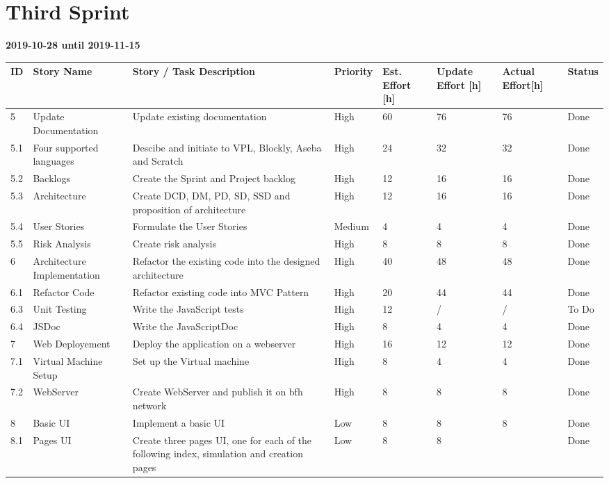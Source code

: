 \documentclass{scrreprt}
\begin{document}
\section{Third Sprint}
\textbf{2019-10-28 until 2019-11-15}
\begin{longtable}{p{5mm}|p{2cm}|p{4cm}|p{1cm}|p{1cm}|p{1cm}|p{1cm}|p{15mm}}
  ID                     & Story Name & Story / Task Description & Priority & Est. Effort {[}h{]} & Update Effort {[}h{]} & Actual Effort{[}h{]} & Status                \\ \hline
  5 & Update Documentation & Update existing documentation & High & 60 & 76 & 76 & Done \\
  5.1 & Four supported languages & Descibe and initiate to VPL, Blockly, Aseba and Scratch & High & 24 & 32 & 32 & Done \\ 
  5.2 & Backlogs & Create the Sprint and Project backlog & High & 12 & 16 & 16 & Done \\ 
  5.3 & Architecture & Create DCD, DM, PD, SD, SSD and proposition of architecture & High & 12 & 16 & 16 & Done \\
  5.4 & User Stories & Formulate the User Stories & Medium & 4 & 4 & 4 & Done \\ 
  5.5 & Risk Analysis & Create risk analysis & High & 8 & 8 & 8 & Done \\ 
  6 & Architecture Implementation & Refactor the existing code into the designed architecture & High & 40 & 48 & 48 & Done \\ 
  6.1 & Refactor Code & Refactor existing code into MVC Pattern & High & 20 & 44 & 44 & Done \\ 
  6.3 & Unit Testing & Write the JavaScript tests & High & 12 & {/} & {/} & To Do \\
  6.4 & JSDoc & Write the JavaScriptDoc & High & 8 & 4 & 4 & Done \\ 
  7 & Web Deployement & Deploy the application on a webserver & High & 16 & 12 & 12 & Done \\ 
  7.1 & Virtual Machine Setup & Set up the Virtual machine & High & 8 & 4 & 4 & Done \\ 
  7.2 & WebServer & Create WebServer and publish it on bfh network & High & 8 & 8 & 8 & Done \\
  8 & Basic UI & Implement a basic UI & Low & 8 & 8 & 8 & Done \\ 
  8.1 & Pages UI & Create three pages UI, one for each of the following index, simulation and creation pages & Low & 8 & 8 &  & Done \\
\end{longtable}
\end{document}

